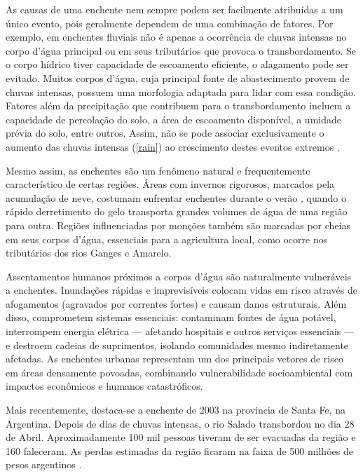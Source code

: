 As causas de uma enchente nem sempre podem ser facilmente atribuídas a um único evento, pois geralmente dependem de uma
combinação de fatores. Por exemplo, em enchentes fluviais não é apenas a ocorrência de chuvas intensas no corpo d'água
principal ou em seus tributários que provoca o transbordamento. Se o corpo hídrico tiver capacidade de escoamento
eficiente, o alagamento pode ser evitado. Muitos corpos d'água, cuja principal fonte de abastecimento provem de chuvas
intensas, possuem uma morfologia adaptada para lidar com essa condição. Fatores além da precipitação que contribuem para
o transbordamento incluem a capacidade de percolação do solo, a área de escoamento disponível, a umidade prévia do solo,
entre outros. Assim, não se pode associar exclusivamente o aumento das chuvas intensas (\autoref{rain}) ao crescimento
destes eventos extremos \cite{ipcc_ar6_wg2_chap11}.

Mesmo assim, as enchentes são um fenômeno natural e frequentemente característico de certas regiões. Áreas com invernos
rigorosos, marcados pela acumulação de neve, costumam enfrentar enchentes durante o verão \cite{atashi}, quando o rápido
derretimento do gelo transporta grandes volumes de água de uma região para outra. Regiões influenciadas por monções
também são marcadas por cheias em seus corpos d'água, essenciais para a agricultura local, como ocorre nos tributários
dos rios Ganges e Amarelo.

Assentamentos humanos próximos a corpos d'água são naturalmente vulneráveis a enchentes. Inundações rápidas e
imprevisíveis colocam vidas em risco através de afogamentos (agravados por correntes fortes) e causam danos estruturais.
Além disso, comprometem sistemas essenciais: contaminam fontes de água potável, interrompem energia elétrica — afetando
hospitais e outros serviços essenciais — e destroem cadeias de suprimentos, isolando comunidades mesmo indiretamente
afetadas. As enchentes urbanas representam um dos principais vetores de risco em áreas densamente povoadas, combinando
vulnerabilidade socioambiental com impactos econômicos e humanos catastróficos. 

Mais recentemente, destaca-se a enchente de 2003 na provincia de Santa Fe, na Argentina. Depois de dias de chuvas
intensas, o rio Salado transbordou no dia 28 de Abril. Aproximadamente 100 mil pessoas tiveram de ser evacuadas da
região e 160 faleceram. As perdas estimadas da região ficaram na faixa de 500 milhões de pesos argentinos
\cite{santa_fe}.


